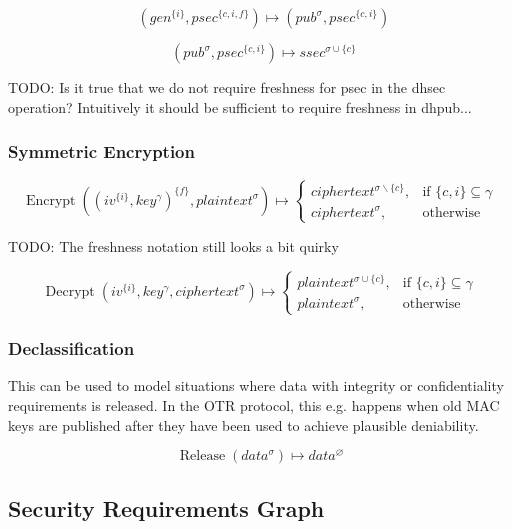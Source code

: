 \documentclass[a4paper]{article}
\DeclareMathOperator{\enc}{Encrypt}
\DeclareMathOperator{\dec}{Decrypt}
\DeclareMathOperator{\dhsec}{DH_{Sec}}
\DeclareMathOperator{\dhpub}{DH_{Pub}}
\DeclareMathOperator{\release}{Release}
\newcommand{\TODO}[1]{\small\noindent\color{red} TODO: #1\color{black}}
\newcommand{\emptysec}{\varnothing}
\newcommand{\secminus}{\smallsetminus}
\begin{document}
$$\dhpub(gen^{\{i\}}, psec^{\{c,i,f\}}) \mapsto (pub^\sigma, psec^{\{c,i\}})$$

$$\dhsec(pub^\sigma, psec^{\{c,i\}}) \mapsto ssec^{\sigma\cup\{c\}} $$

\TODO{Is it true that we do not require freshness for psec in the dhsec operation? Intuitively it should be sufficient to require freshness in dhpub...}

\subsubsection{Symmetric Encryption}

\begin{equation*}
    \enc((iv^{\{i\}}, key^\gamma)^{\{f\}}, plaintext^\sigma) \mapsto
    \begin{cases}
        ciphertext^{\sigma\secminus\{c\}}, & \text{if $\{c,i\} \subseteq \gamma$} \\
        ciphertext^{\sigma},               & \text{otherwise}
    \end{cases}
\end{equation*}

\TODO{The freshness notation still looks a bit quirky}

\begin{equation*}
    \dec(iv^{\{i\}}, key^\gamma, ciphertext^\sigma) \mapsto
    \begin{cases}
        plaintext^{\sigma\cup\{c\}}, & \text{if $\{c,i\} \subseteq \gamma$} \\
        plaintext^{\sigma},          & \text{otherwise}
    \end{cases}
\end{equation*}

\subsubsection{Declassification}

This can be used to model situations where data with integrity or
confidentiality requirements is released. In the OTR protocol, this e.g.
happens when old MAC keys are published after they have been used to achieve
plausible deniability.

$$\release(data^\sigma) \mapsto data^\emptysec $$

\subsection{Security Requirements Graph}
\end{document}
